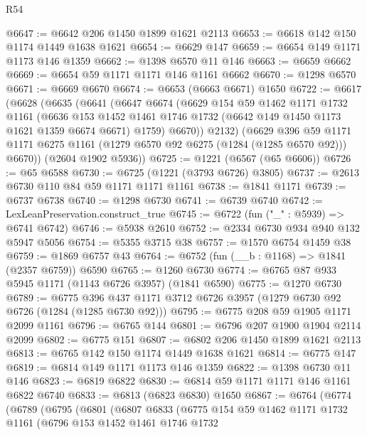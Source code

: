 \begin{lexlean}{R54}
\begin{coremodule}
@6647 := @6642 @206 @1450 @1899 @1621 @2113
@6653 := @6618 @142 @150 @1174 @1449 @1638 @1621
@6654 := @6629 @147
@6659 := @6654 @149 @1171 @1173 @146 @1359
@6662 := @1398 @6570 @11 @146
@6663 := @6659 @6662
@6669 := @6654 @59 @1171 @1171 @146 @1161 @6662
@6670 := @1298 @6570
@6671 := @6669 @6670
@6674 := @6653 (@6663 @6671) @1650
@6722 := @6617
    (@6628
      (@6635
        (@6641
          (@6647
            @6674
            (@6629
              @154
              @59
              @1462
              @1171
              @1732
              @1161
              (@6636
                @153
                @1452
                @1461
                @1746
                @1732
                (@6642 @149 @1450 @1173 @1621 @1359 @6674 @6671)
                @1759)
              @6670))
          @2132)
        (@6629
          @396
          @59
          @1171
          @1171
          @6275
          @1161
          (@1279 @6570 @92 @6275 (@1284 (@1285 @6570 @92)))
          @6670))
      (@2604 @1902 @5936))
@6725 := @1221 (@6567 (@65 @6606))
@6726 := @65 @6588
@6730 := @6725 (@1221 (@3793 @6726) @3805)
@6737 := @2613 @6730 @110 @84 @59 @1171 @1171 @1161
@6738 := @1841 @1171
@6739 := @6737 @6738
@6740 := @1298 @6730
@6741 := @6739 @6740
@6742 := LexLeanPreservation.construct_true
@6745 := @6722 (fun ("_" : @5939) => @6741 @6742)
@6746 := @5938 @2610
@6752 := @2334 @6730 @934 @940 @132 @5947 @5056
@6754 := @5355 @3715 @38
@6757 := @1570 @6754 @1459 @38
@6759 := @1869 @6757 @43
@6764 := @6752 (fun (__b : @1168) => @1841 (@2357 @6759)) @6590
@6765 := @1260 @6730
@6774 := @6765 @87 @933 @5945 @1171 (@1143 @6726 @3957) (@1841 @6590)
@6775 := @1270 @6730
@6789 := @6775 @396 @437 @1171 @3712 @6726 @3957 (@1279 @6730 @92 @6726 (@1284 (@1285 @6730 @92)))
@6795 := @6775 @208 @59 @1905 @1171 @2099 @1161
@6796 := @6765 @144
@6801 := @6796 @207 @1900 @1904 @2114 @2099
@6802 := @6775 @151
@6807 := @6802 @206 @1450 @1899 @1621 @2113
@6813 := @6765 @142 @150 @1174 @1449 @1638 @1621
@6814 := @6775 @147
@6819 := @6814 @149 @1171 @1173 @146 @1359
@6822 := @1398 @6730 @11 @146
@6823 := @6819 @6822
@6830 := @6814 @59 @1171 @1171 @146 @1161 @6822 @6740
@6833 := @6813 (@6823 @6830) @1650
@6867 := @6764
    (@6774
      (@6789
        (@6795
          (@6801
            (@6807
              @6833
              (@6775
                @154
                @59
                @1462
                @1171
                @1732
                @1161
                (@6796
                  @153
                  @1452
                  @1461
                  @1746
                  @1732

\end{coremodule}
\end{lexlean}
